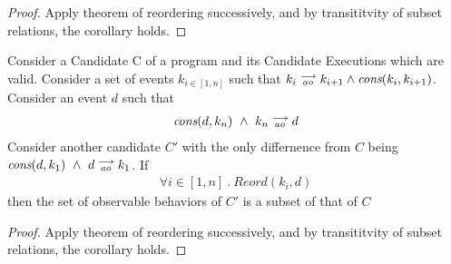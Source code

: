 \begin{proof}
    Apply theorem of reordering successively, and by transititvity of subset relations, the corollary holds.
\end{proof}

\begin{corollary}
    \label{CorollCodeMotion2}
    Consider a Candidate C of a program and its Candidate Executions which are valid. Consider a set of events $k_{i \in[1,n]}$ such that $k_i\stackrel{\longrightarrow}{_{ao}}k_{i+1} \wedge \textit{cons}(k_i,k_{i+1})$.
    Consider an event $d$ such that 
    \begin{align*}
        \textit{cons}(d,k_n) \ \wedge \ k_n\stackrel{\longrightarrow}{_{ao}}d  
    \end{align*}
    Consider another candidate $C'$ with the only differnence from $C$ being $\cons{d}{k_1} \ \wedge \ \reln{d}{ao}{k_1}$.
    If 
    \begin{align*}
        \forall i \in [1,n] \ . \ Reord(k_i,d)
    \end{align*} 
    then the set of observable behaviors of $C'$ is a subset of that of $C$ 
\end{corollary}

\begin{proof}
    Apply theorem of reordering successively, and by transititvity of subset relations, the corollary holds.
\end{proof}

